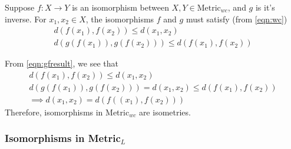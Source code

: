 \begin{frame}
    Suppose \(f:X\rightarrow Y\) is an isomorphism between \(X,Y\in \text{Metric}_{wc}\), and \(g\) is it's inverse. 
    For \(x_1,x_2\in X\), the isomorphisms \(f\) and \(g\) must satisfy (from \autoref{eqn:wc})
    \begin{gather}
        d(f(x_1),f(x_2))\leq d(x_1,x_2)\\
        d(g(f(x_1)),g(f(x_2)))\leq d(f(x_1),f(x_2))
    \end{gather}

    From \autoref{eqn:gfresult}, we see that 
    \begin{gather*}
        d(f(x_1),f(x_2))\leq d(x_1,x_2)\\
        d(g(f(x_1)),g(f(x_2)))=d(x_1, x_2)\leq d(f(x_1),f(x_2))\\
        \implies d(x_1,x_2)=d(f((x_1),f(x_2)))
    \end{gather*}
    Therefore, isomorphisms in Metric\(_{wc}\) are isometries.

\end{frame}

\begin{frame}
    \frametitle{Isomorphisms in Metric\(_{L}\)}

    

\end{frame}